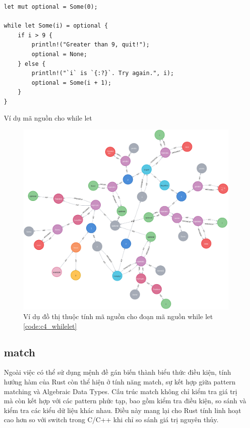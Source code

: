 \begin{listing}[H]
\begin{verbatim}
let mut optional = Some(0);

while let Some(i) = optional {
    if i > 9 {
        println!("Greater than 9, quit!");
        optional = None;
    } else {
        println!("`i` is `{:?}`. Try again.", i);
        optional = Some(i + 1);
    }
}
\end{verbatim}
\caption{Ví dụ mã nguồn cho while let}
\label{code:c4_whilelet}
\end{listing}

\begin{figure}[H]
    \includegraphics[width=1\columnwidth]{figures/c4/c4_whilelet.png}
    \centering
    \caption{Ví dụ đồ thị thuộc tính mã nguồn cho đoạn mã nguồn while let \ref{code:c4_whilelet}}
    \label{img:c4_cpg_whilelet}
\end{figure}

\subsection{match}

Ngoài việc có thể sử dụng mệnh đề gán biến thành biểu thức điều kiện, tính hướng hàm của Rust còn thể hiện ở tính năng match, sự kết hợp giữa pattern matching và Algebraic Data Types.
Cấu trúc match không chỉ kiểm tra giá trị mà còn kết hợp với các pattern phức tạp, bao gồm kiểm tra điều kiện, so sánh và kiểm tra các kiểu dữ liệu khác nhau.
Điều này mang lại cho Rust tính linh hoạt cao hơn so với switch trong C/C++ khi chỉ so sánh giá trị nguyên thủy.

